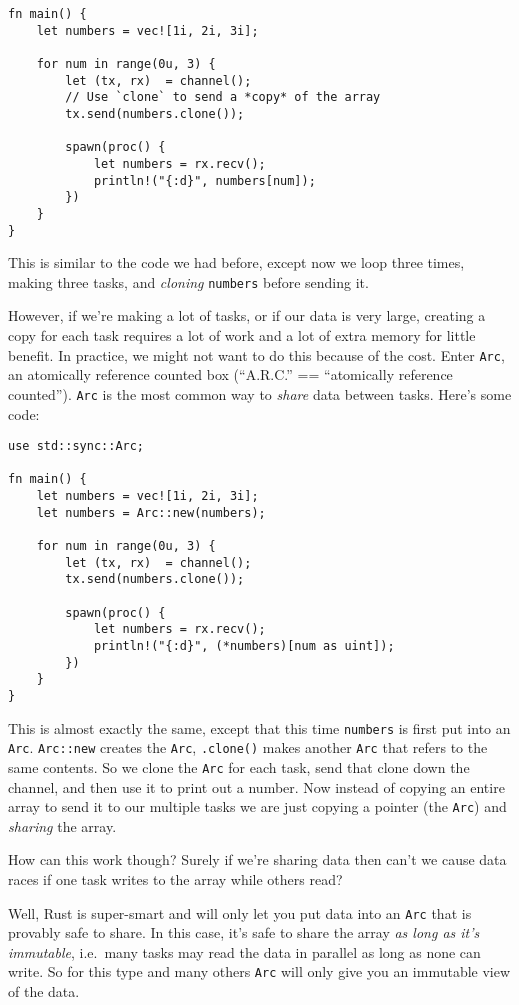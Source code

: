 \documentclass[]{article}
\begin{document}
\begin{verbatim}
fn main() {
    let numbers = vec![1i, 2i, 3i];

    for num in range(0u, 3) {
        let (tx, rx)  = channel();
        // Use `clone` to send a *copy* of the array
        tx.send(numbers.clone());

        spawn(proc() {
            let numbers = rx.recv();
            println!("{:d}", numbers[num]);
        })
    }
}
\end{verbatim}

This is similar to the code we had before, except now we loop three
times, making three tasks, and \emph{cloning} \texttt{numbers} before
sending it.

However, if we're making a lot of tasks, or if our data is very large,
creating a copy for each task requires a lot of work and a lot of extra
memory for little benefit. In practice, we might not want to do this
because of the cost. Enter \texttt{Arc}, an atomically reference counted
box (``A.R.C.'' == ``atomically reference counted''). \texttt{Arc} is
the most common way to \emph{share} data between tasks. Here's some
code:

\begin{verbatim}
use std::sync::Arc;

fn main() {
    let numbers = vec![1i, 2i, 3i];
    let numbers = Arc::new(numbers);

    for num in range(0u, 3) {
        let (tx, rx)  = channel();
        tx.send(numbers.clone());

        spawn(proc() {
            let numbers = rx.recv();
            println!("{:d}", (*numbers)[num as uint]);
        })
    }
}
\end{verbatim}

This is almost exactly the same, except that this time \texttt{numbers}
is first put into an \texttt{Arc}. \texttt{Arc::new} creates the
\texttt{Arc}, \texttt{.clone()} makes another \texttt{Arc} that refers
to the same contents. So we clone the \texttt{Arc} for each task, send
that clone down the channel, and then use it to print out a number. Now
instead of copying an entire array to send it to our multiple tasks we
are just copying a pointer (the \texttt{Arc}) and \emph{sharing} the
array.

How can this work though? Surely if we're sharing data then can't we
cause data races if one task writes to the array while others read?

Well, Rust is super-smart and will only let you put data into an
\texttt{Arc} that is provably safe to share. In this case, it's safe to
share the array \emph{as long as it's immutable}, i.e.~many tasks may
read the data in parallel as long as none can write. So for this type
and many others \texttt{Arc} will only give you an immutable view of the
data.
\end{document}
